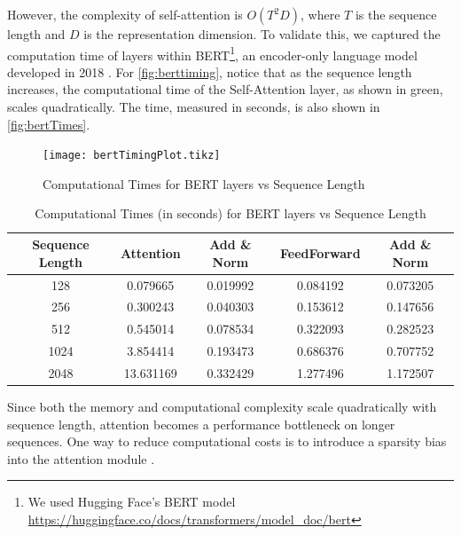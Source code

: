 \documentclass[11pt]{article}
\begin{document}
However, the complexity of self-attention is $O(T^2D)$, where $T$ is the sequence length and $D$ is the representation dimension. To validate this, we captured the computation time of layers within BERT\footnote{We used Hugging Face's BERT model \url{https://huggingface.co/docs/transformers/model_doc/bert}}, an encoder-only language model developed in 2018 \cite{devlin2018bert}. For \autoref{fig:berttiming}, notice that as the sequence length increases, the computational time of the Self-Attention layer, as shown in green, scales quadratically. The time, measured in seconds, is also shown in \autoref{fig:bertTimes}.
\begin{figure}[H]
\testdata
    \centering
    \texttt{[image: bertTimingPlot.tikz]}
    \caption{Computational Times for BERT layers vs Sequence Length}
    \label{fig:berttiming}
\end{figure}
\begin{table}[h!]
\centering
 \begin{tabular}{||c | c c c c||} 
 \hline
 Sequence Length & Attention & Add \& Norm & FeedForward & Add \& Norm \\ [0.5ex] 
 \hline\hline
 128 & 0.079665 & 0.019992 & 0.084192 & 0.073205 \\
 256 & 0.300243 & 0.040303 & 0.153612 & 0.147656 \\
 512 & 0.545014 & 0.078534 & 0.322093 & 0.282523 \\
 1024 & 3.854414 & 0.193473 & 0.686376 & 0.707752 \\
 2048 & 13.631169 & 0.332429 & 1.277496 & 1.172507 \\ [1ex] 
 \hline
 \end{tabular}
  \caption{Computational Times (in seconds) for BERT layers vs
Sequence Length}
  \label{fig:bertTimes}
\end{table}
Since both the memory and computational complexity scale quadratically with sequence length, attention becomes a performance bottleneck on longer sequences. One way to reduce computational costs is to introduce a sparsity bias into the attention module \cite{child2019generating}.
\end{document}
